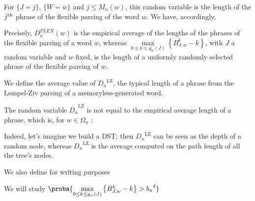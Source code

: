 \noindent
For $\{ J = j \}$, $\{ W = w \}$ and $j \leq M_n(w)$, this random variable is the length of 
the $j^{\textmd{th}}$ phrase of the flexible parsing of the word $w$. We have,
accordingly,

\noindent
Precisely, $D_n^{FLEX}(w)$ is the empirical average of the lengths of the phrases
of the flexible parsing of a word $w$, whereas 
        $\underset{ 0 \leq k \leq g_w(J) }{ \max } 
        \left\{ { B_{J, w}^k - k } \right\} $,
with $J$ a random variable and $w$ fixed,
is the length of a uniformly randomly selected phrase of the flexible parsing
of $w$. 

\begin{df}
    We define
    \noindent the average value of ${D_n}^{\text{LZ}}$, the
    typical length of a phrase from the Lempel-Ziv parsing 
    of a memoryless-generated word.
\end{df}

\begin{rmk}
    The random variable $\overline{D_n}^{\text{LZ}}$ is not equal
    to the empirical average length of a phrase, which is,
    for $w \in \Omega_n$ :

    \noindent
    Indeed, let's imagine we build a DST; then ${D_n}^{\text{LZ}}$
    can be seen as the depth of a random node, whereas 
    ${D_n}^{\text{LZ}}$ is the average computed on the path
    length of all the tree's nodes.
\end{rmk}

\begin{df}
    We also define for writing purposes
\end{df}

\noindent
We will study
    \centers
    {$ \proba{ 
        \underset{ 0 \leq k \leq g_w(J) }{ \max } 
        \left\{ { B_{J, w}^k - k } \right\}
            > {b_n}^{\delta} } $}